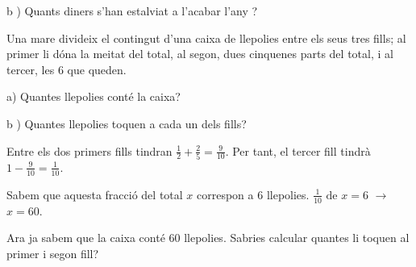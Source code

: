 \begin{mylist}
b ) Quants diners s'han estalviat a l'acabar l'any ?

\answers{[$\dfrac{3}{20}=15$ \%, $12960$ \euro{}]}


	\exer  Una mare divideix el contingut d'una caixa de llepolies entre els seus tres fills; al primer li dóna la meitat del total, al segon, dues cinquenes parts del total, i al tercer, les 6 que queden. 


a) Quantes llepolies conté la caixa? 

b ) Quantes llepolies toquen a cada un dels fills?
\vspace{0.5cm}


\end{mylist}

\begin{example}[*]
	Entre els dos primers fills tindran $\frac{1}{2} + \frac{2}{5}= \frac{9}{10}$.
	Per tant, el tercer fill tindrà $1-\frac{9}{10}= \frac{1}{10}$.
	
	Sabem que aquesta fracció del total $x$ correspon a 6 llepolies.
	$\frac{1}{10} \text{ de } x = 6$ \quad $\rightarrow$ \quad $x=60$.
	
	Ara ja sabem que la caixa conté 60 llepolies. Sabries calcular quantes li toquen al primer i segon fill?
	
\end{example}

\pagebreak


